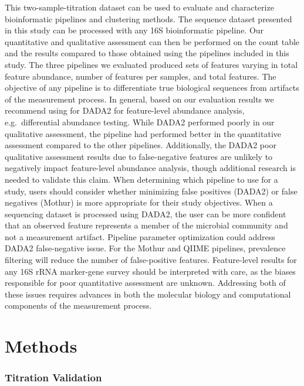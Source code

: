 \documentclass{bmcart}
\begin{document}
This two-sample-titration dataset can be used to evaluate and
characterize bioinformatic pipelines and clustering methods. The
sequence dataset presented in this study can be processed with any 16S
bioinformatic pipeline. Our quantitative and qualitative assessment can
then be performed on the count table and the results compared to those
obtained using the pipelines included in this study. The three pipelines
we evaluated produced sets of features varying in total feature
abundance, number of features per samples, and total features. The
objective of any pipeline is to differentiate true biological sequences
from artifacts of the measurement process. In general, based on our
evaluation results we recommend using for DADA2 for feature-level
abundance analysis, e.g.~differential abundance testing. While DADA2
performed poorly in our qualitative assessment, the pipeline had
performed better in the quantitative assessment compared to the other
pipelines. Additionally, the DADA2 poor qualitative assessment results
due to false-negative features are unlikely to negatively impact
feature-level abundance analysis, though additional research is needed
to validate this claim. When determining which pipeline to use for a
study, users should consider whether minimizing false positives (DADA2)
or false negatives (Mothur) is more appropriate for their study
objectives. When a sequencing dataset is processed using DADA2, the user
can be more confident that an observed feature represents a member of
the microbial community and not a measurement artifact. Pipeline
parameter optimization could address DADA2 false-negative issue. For the
Mothur and QIIME pipelines, prevalence filtering will reduce the number
of false-positive features. Feature-level results for any 16S rRNA
marker-gene survey should be interpreted with care, as the biases
responsible for poor quantitative assessment are unknown. Addressing
both of these issues requires advances in both the molecular biology and
computational components of the measurement process.


\section*{Methods}

\subsubsection*{Titration Validation}
\end{document}
